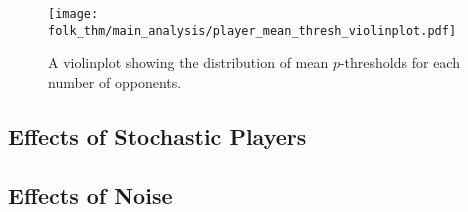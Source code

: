 \begin{figure}
    \centering
    \texttt{[image: folk\_thm/main\_analysis/player\_mean\_thresh\_violinplot.pdf]}
    \caption{A violinplot showing the distribution of mean \(p\)-thresholds for each number of opponents.}\label{fig:player_mean_thresh_violinplot}
\end{figure}


\subsection{Effects of Stochastic Players}\label{subsec:Effects_of_Stochastic_Players}






\subsection{Effects of Noise}\label{subsec:Effects_of_Noise}



